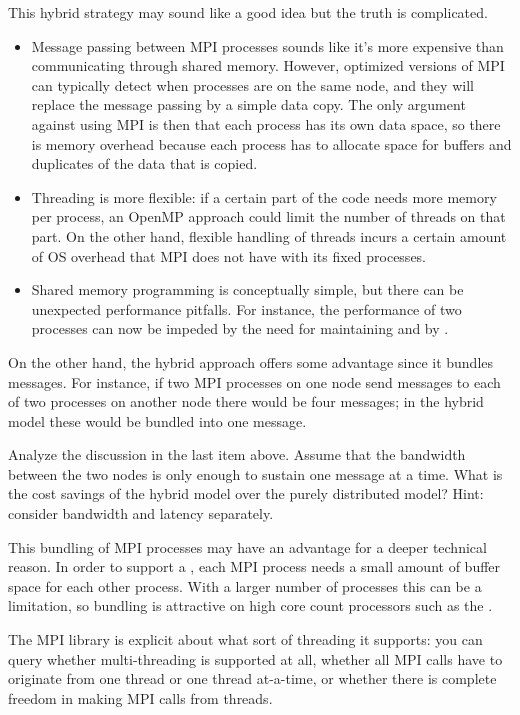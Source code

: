 This hybrid strategy may sound like a good idea but the truth is complicated.
\begin{itemize}
\item Message passing between MPI processes sounds like it's more
  expensive than communicating through shared memory. However,
  optimized versions of MPI can typically detect when processes are on
  the same node, and they will replace the message passing by a simple
  data copy. The only argument against using MPI is then that each
  process has its own data space, so there is memory overhead because
  each process has to allocate space for buffers and duplicates of the
  data that is copied.
\item Threading is more flexible: if a certain part of the code needs
  more memory per process, an OpenMP approach could limit the number
  of threads on that part. On the other hand, flexible handling of
  threads incurs a certain amount of \ac{OS} overhead that MPI does
  not have with its fixed processes.
\item Shared memory programming is conceptually simple, but there can
  be unexpected performance pitfalls. For instance, the performance of
  two processes can now be impeded by the need for maintaining
   and by .
\end{itemize}

On the other hand, the hybrid approach offers some advantage since it
bundles messages. For instance, if two MPI processes on one node send
messages to each of two processes on another node there would be four
messages; in the hybrid model these would be bundled into one
message.

\begin{exercise}
  Analyze the discussion in the last item above. Assume that the
  bandwidth between the two nodes is only enough to sustain one
  message at a time. What is the cost savings of the hybrid model over
  the purely distributed model? Hint: consider bandwidth and latency
  separately.
\end{exercise}

This bundling of MPI processes may have an advantage for a deeper
technical reason. In order to support a ,
each MPI process needs a small amount of buffer space for each other process.
With a larger number of processes this can be a limitation, so bundling
is attractive on high core count processors such as the .

The MPI library is explicit about what sort of threading it supports:
you can query whether multi-threading is supported at all, whether all MPI 
calls have to originate from one thread or one thread at-a-time, or whether 
there is complete freedom in making MPI calls from threads.

